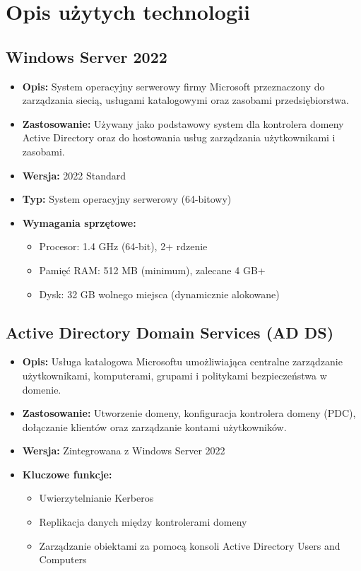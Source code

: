 \newpage

\section{Opis użytych technologii}
\label{sec:technologie}
\subsection{Windows Server 2022}
\begin{itemize}
\item \textbf{Opis:} System operacyjny serwerowy firmy Microsoft przeznaczony do zarządzania siecią, usługami katalogowymi oraz zasobami przedsiębiorstwa.
\item \textbf{Zastosowanie:} Używany jako podstawowy system dla kontrolera domeny Active Directory oraz do hostowania usług zarządzania użytkownikami i zasobami.
\item \textbf{Wersja:} 2022 Standard
\item \textbf{Typ:} System operacyjny serwerowy (64-bitowy)
\item \textbf{Wymagania sprzętowe:}
\begin{itemize}
\item Procesor: 1.4 GHz (64-bit), 2+ rdzenie
\item Pamięć RAM: 512 MB (minimum), zalecane 4 GB+
\item Dysk: 32 GB wolnego miejsca (dynamicznie alokowane)
\end{itemize}
\end{itemize}

\subsection{Active Directory Domain Services (AD DS)}
\begin{itemize}
\item \textbf{Opis:} Usługa katalogowa Microsoftu umożliwiająca centralne zarządzanie użytkownikami, komputerami, grupami i politykami bezpieczeństwa w domenie.
\item \textbf{Zastosowanie:} Utworzenie domeny, konfiguracja kontrolera domeny (PDC), dołączanie klientów oraz zarządzanie kontami użytkowników.
\item \textbf{Wersja:} Zintegrowana z Windows Server 2022
\item \textbf{Kluczowe funkcje:}
\begin{itemize}
\item Uwierzytelnianie Kerberos
\item Replikacja danych między kontrolerami domeny
\item Zarządzanie obiektami za pomocą konsoli Active Directory Users and Computers
\end{itemize}
\end{itemize}

